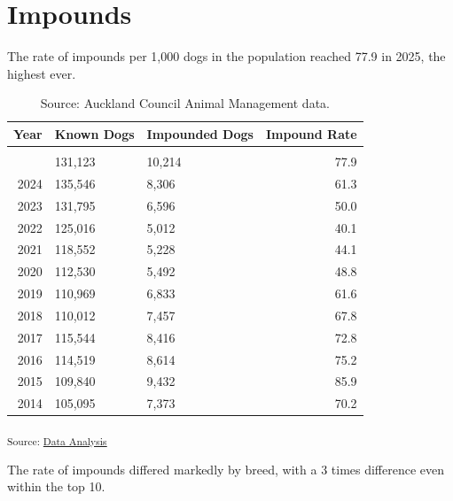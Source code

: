 \documentclass[
  letterpaper,
  DIV=11,
  numbers=noendperiod]{scrartcl}
\begin{document}
\section{Impounds}\label{impounds}

The rate of impounds per 1,000 dogs in the population reached 77.9 in
2025, the highest ever.

{

\begin{longtable}[]{@{}rllr@{}}

\toprule\noalign{}
Year & Known Dogs & Impounded Dogs & Impound Rate \\
\midrule\noalign{}
\endhead
\bottomrule\noalign{}

\caption{\label{tbl-impound-rate}Source: Auckland Council Animal
Management data.}

\tabularnewline

\endlastfoot
2025 & 131,123 & 10,214 & 77.9 \\
2024 & 135,546 & 8,306 & 61.3 \\
2023 & 131,795 & 6,596 & 50.0 \\
2022 & 125,016 & 5,012 & 40.1 \\
2021 & 118,552 & 5,228 & 44.1 \\
2020 & 112,530 & 5,492 & 48.8 \\
2019 & 110,969 & 6,833 & 61.6 \\
2018 & 110,012 & 7,457 & 67.8 \\
2017 & 115,544 & 8,416 & 72.8 \\
2016 & 114,519 & 8,614 & 75.2 \\
2015 & 109,840 & 9,432 & 85.9 \\
2014 & 105,095 & 7,373 & 70.2 \\

\end{longtable}

}

\textsubscript{Source:
\href{https://tesaunders.github.io/dog-control/notebooks/data-analysis-preview.html\#cell-tbl-impound-rate}{Data
Analysis}}

The rate of impounds differed markedly by breed, with a 3 times
difference even within the top 10.
\end{document}
